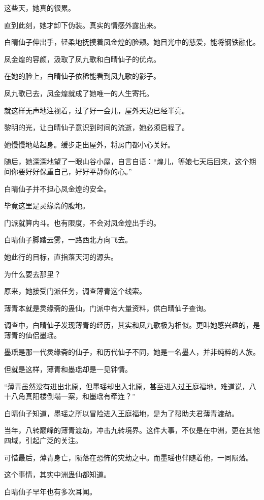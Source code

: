 \begin{this_body}
这些天，她真的很累。

直到此刻，她才卸下伪装。真实的情感外露出来。

白晴仙子伸出手，轻柔地抚摸着凤金煌的脸颊。她目光中的慈爱，能将钢铁融化。

凤金煌的容颜，汲取了凤九歌和白晴仙子的优点。

在她的脸上，白晴仙子依稀能看到凤九歌的影子。

凤九歌已去，凤金煌就成了她唯一的人生寄托。

就这样无声地注视着，过了好一会儿，屋外天边已经半亮。

黎明的光，让白晴仙子意识到时间的流逝，她必须启程了。

她慢慢地站起身。缓步走出屋外，将房门都小心关好。

随后，她深深地望了一眼山谷小屋，自言自语：“煌儿，等娘七天后回来，这个期间你要好好保重自己，好好平静你的心。”

白晴仙子并不担心凤金煌的安全。

毕竟这里是灵缘斋的腹地。

门派就算内斗。也有限度，不会对凤金煌出手的。

白晴仙子脚踏云雾，一路西北方向飞去。

她此行的目标，直指落天河的源头。

为什么要去那里？

原来，她接受门派任务，调查薄青这个线索。

薄青本就是灵缘斋的蛊仙，门派中有大量资料，供白晴仙子查询。

调查中，白晴仙子发现薄青的经历，其实和凤九歌极为相似。更叫她感兴趣的，是薄青的仙侣墨瑶。

墨瑶是那一代灵缘斋的仙子，和历代仙子不同，她是一名墨人，并非纯粹的人族。

但就是这样，薄青和墨瑶却是一见钟情。

“薄青虽然没有进出北原，但墨瑶却出入北原，甚至进入过王庭福地。难道说，八十八角真阳楼倒塌一案，和墨瑶有牵连？”

白晴仙子知道，墨瑶之所以冒险进入王庭福地，是为了帮助夫君薄青渡劫。

当年，八转巅峰的薄青渡劫，冲击九转境界。这件大事，不仅是在中洲，更在其他四域，引起广泛的关注。

可惜最后，薄青身亡，陨落在恐怖的灾劫之中。而墨瑶也伴随着他，一同陨落。

这个事情，其实中洲蛊仙都知道。

白晴仙子早年也有多次耳闻。


\end{this_body}
